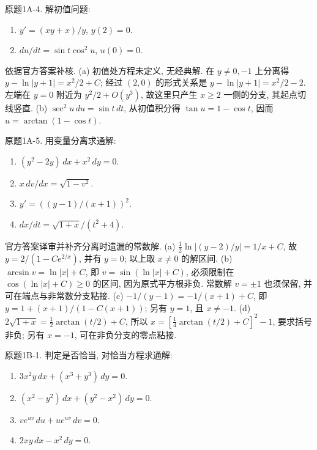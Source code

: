 \begin{exercise}\label{cw:bank-1A-4}
原题1A-4. 解初值问题:
\begin{enumerate}[label=\alph*)]
\item $y'=(xy+x)/y$, $y(2)=0$.
\item $du/dt=\sin t\cos^2u$, $u(0)=0$.
\end{enumerate}
\end{exercise}
\begin{solution}
依据官方答案补核. (a) 初值处方程未定义, 无经典解. 在 $y\ne0,-1$ 上分离得 $y-\ln|y+1|=x^2/2+C$; 经过 $(2,0)$ 的形式关系是 $y-\ln|y+1|=x^2/2-2$. 左端在 $y=0$ 附近为 $y^2/2+O(y^3)$, 故这里只产生 $x\ge2$ 一侧的分支, 其起点切线竖直. (b) $\sec^2u\,du=\sin t\,dt$, 从初值积分得 $\tan u=1-\cos t$, 因而 $u=\arctan(1-\cos t)$.
\end{solution}
\begin{exercise}\label{cw:bank-1A-5}
原题1A-5. 用变量分离求通解:
\begin{enumerate}[label=\alph*)]
\item $(y^2-2y)\,dx+x^2\,dy=0$.
\item $x\,dv/dx=\sqrt{1-v^2}$.
\item $y'=((y-1)/(x+1))^2$.
\item $dx/dt=\sqrt{1+x}/(t^2+4)$.
\end{enumerate}
\end{exercise}
\begin{solution}
官方答案译审并补齐分离时遗漏的常数解. (a) $\frac12\ln|(y-2)/y|=1/x+C$, 故 $y=2/(1-Ce^{2/x})$, 并有 $y=0$; 以上取 $x\ne0$ 的解区间. (b) $\arcsin v=\ln|x|+C$, 即 $v=\sin(\ln|x|+C)$, 必须限制在 $\cos(\ln|x|+C)\ge0$ 的区间, 因为原式平方根非负. 常数解 $v=\pm1$ 也须保留, 并可在端点与非常数分支粘接. (c) $-1/(y-1)=-1/(x+1)+C$, 即 $y=1+(x+1)/(1-C(x+1))$; 另有 $y=1$, 且 $x\ne-1$. (d) $2\sqrt{1+x}=\frac12\arctan(t/2)+C$, 所以 $x=[\frac14\arctan(t/2)+C]^2-1$, 要求括号非负; 另有 $x=-1$, 可在非负分支的零点粘接.
\end{solution}
\begin{exercise}\label{cw:bank-1B-1}
原题1B-1. 判定是否恰当, 对恰当方程求通解:
\begin{enumerate}[label=\alph*)]
\item $3x^2y\,dx+(x^3+y^3)\,dy=0$.
\item $(x^2-y^2)\,dx+(y^2-x^2)\,dy=0$.
\item $ve^{uv}\,du+ue^{uv}\,dv=0$.
\item $2xy\,dx-x^2\,dy=0$.
\end{enumerate}
\end{exercise}
